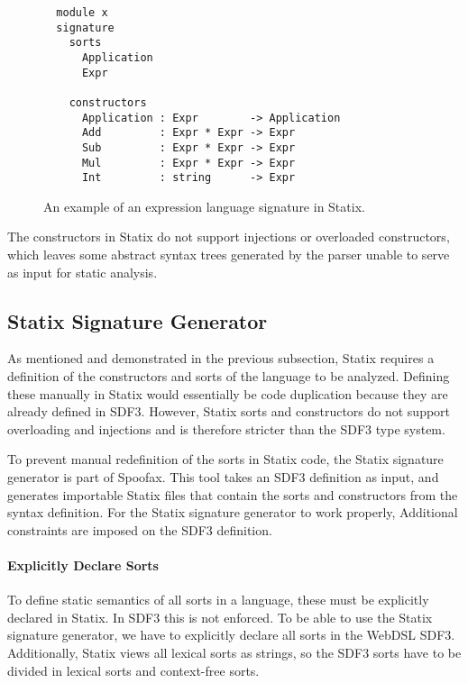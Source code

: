       \begin{wrapfigure}{r}{0.58\linewidth}
        \capstart
        \begin{verbatim}
  module x
  signature
    sorts
      Application
      Expr
    
    constructors
      Application : Expr        -> Application
      Add         : Expr * Expr -> Expr
      Sub         : Expr * Expr -> Expr
      Mul         : Expr * Expr -> Expr
      Int         : string      -> Expr
        \end{verbatim}
        \caption{\label{fig:statix-expression-language}An example of an expression language signature in Statix.}
      \end{wrapfigure}

      The constructors in Statix do not support injections or overloaded constructors, which leaves some abstract syntax trees generated by the parser unable to serve as input for static analysis.

    \subsection{\label{subsec:statix-signature-generator}Statix Signature Generator}

      As mentioned and demonstrated in the previous subsection, Statix requires a definition of the constructors and sorts of the language to be analyzed. Defining these manually in Statix would essentially be code duplication because they are already defined in SDF3. However, Statix sorts and constructors do not support overloading and injections and is therefore stricter than the SDF3 type system.

      To prevent manual redefinition of the sorts in Statix code, the Statix signature generator is part of Spoofax. This tool takes an SDF3 definition as input, and generates importable Statix files that contain the sorts and constructors from the syntax definition. For the Statix signature generator to work properly, Additional constraints are imposed on the SDF3 definition.

      \paragraph{Explicitly Declare Sorts} To define static semantics of all sorts in a language, these must be explicitly declared in Statix. In SDF3 this is not enforced. To be able to use the Statix signature generator, we have to explicitly declare all sorts in the WebDSL SDF3. Additionally, Statix views all lexical sorts as strings, so the SDF3 sorts have to be divided in lexical sorts and context-free sorts.

